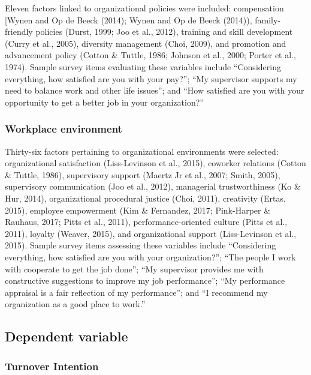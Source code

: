\documentclass[
  jou]{apa6}
\begin{document}
Eleven factors linked to organizational policies were included: compensation {[}Wynen and Op de Beeck (2014); Wynen and Op de Beeck (2014)), family-friendly policies (Durst, 1999; Joo et al., 2012), training and skill development (Curry et al., 2005), diversity management (Choi, 2009), and promotion and advancement policy (Cotton \& Tuttle, 1986; Johnson et al., 2000; Porter et al., 1974).
Sample survey items evaluating these variables include ``Considering everything, how satisfied are you with your pay?''; ``My supervisor supports my need to balance work and other life issues''; and ``How satisfied are you with your opportunity to get a better job in your organization?''

\hypertarget{workplace-environment}{%
\subsubsection{Workplace environment}\label{workplace-environment}}

Thirty-six factors pertaining to organizational environments were selected: organizational satisfaction (Liss-Levinson et al., 2015), coworker relations (Cotton \& Tuttle, 1986), supervisory support (Maertz Jr et al., 2007; Smith, 2005), supervisory communication (Joo et al., 2012), managerial trustworthiness (Ko \& Hur, 2014), organizational procedural justice (Choi, 2011), creativity (Ertas, 2015), employee empowerment (Kim \& Fernandez, 2017; Pink-Harper \& Rauhaus, 2017; Pitts et al., 2011), performance-oriented culture (Pitts et al., 2011), loyalty (Weaver, 2015), and organizational support (Liss-Levinson et al., 2015).
Sample survey items assessing these variables include ``Considering everything, how satisfied are you with your organization?''; ``The people I work with cooperate to get the job done''; ``My supervisor provides me with constructive suggestions to improve my job performance''; ``My performance appraisal is a fair reflection of my performance''; and ``I recommend my organization as a good place to work.''

\hypertarget{dependent-variable}{%
\subsection{Dependent variable}\label{dependent-variable}}

\hypertarget{turnover-intention}{%
\subsubsection{Turnover Intention}\label{turnover-intention}}
\end{document}
